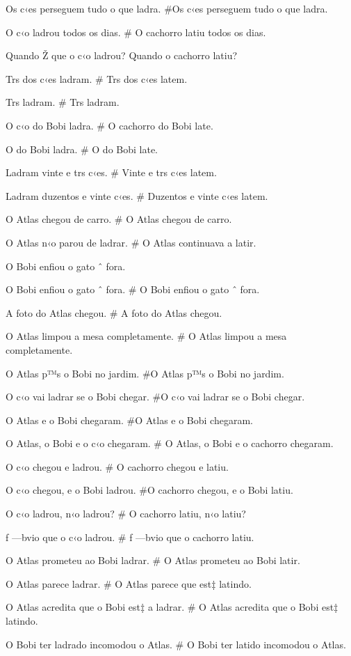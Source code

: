 Os c‹es perseguem tudo o que ladra.
#Os c‹es perseguem tudo o que ladra.

O c‹o ladrou todos os dias.
# O cachorro latiu todos os dias.

Quando Ž que o c‹o ladrou?
Quando o cachorro latiu?

Trs dos c‹es ladram.
# Trs dos c‹es latem.

Trs ladram.
# Trs ladram.

O c‹o do Bobi ladra.
# O  cachorro do Bobi late.

O do Bobi ladra.
# O do Bobi late.

Ladram vinte e trs c‹es.
# Vinte e trs c‹es latem.

Ladram duzentos e vinte c‹es.
# Duzentos e vinte c‹es latem.

O Atlas chegou de carro.
# O Atlas chegou de carro.

O Atlas n‹o parou de ladrar.
# O Atlas continuava a latir.

O Bobi enfiou o gato ˆ fora.

O Bobi enfiou o gato ˆ fora.
# O Bobi enfiou o gato ˆ fora.

A foto do Atlas chegou.
# A foto do Atlas chegou.

O Atlas limpou a mesa completamente.
# O Atlas limpou a mesa completamente.

O Atlas p™s o Bobi no jardim.
#O Atlas p™s o Bobi no jardim.

O c‹o vai ladrar se o Bobi chegar.
#O c‹o vai ladrar se o Bobi chegar.

O Atlas e o Bobi chegaram.
#O Atlas e o Bobi chegaram.

O Atlas, o Bobi e o c‹o chegaram.
# O Atlas, o Bobi e o cachorro chegaram.

O c‹o chegou e ladrou.
# O cachorro chegou e latiu.

O c‹o chegou, e o Bobi ladrou.
#O cachorro chegou, e o Bobi latiu.

O c‹o ladrou, n‹o ladrou?
# O cachorro latiu, n‹o latiu?

ƒ —bvio que o c‹o ladrou.
# ƒ —bvio que o cachorro latiu.

O Atlas prometeu ao Bobi ladrar.
# O Atlas prometeu ao Bobi latir.

O Atlas parece ladrar.
# O Atlas parece que est‡ latindo.

O Atlas acredita que o Bobi est‡ a ladrar.
# O Atlas acredita que o Bobi est‡ latindo.

O Bobi ter ladrado incomodou o Atlas.
# O Bobi ter latido incomodou o Atlas.

